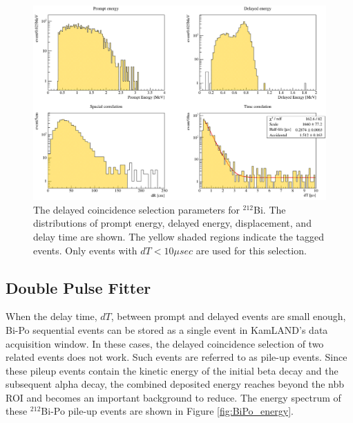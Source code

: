 \begin{figure}[htb]
	\centering
	\includegraphics[scale=0.45]{bi212.png}
	\caption{The delayed coincidence selection parameters for $^{212}$Bi. The distributions of prompt energy, delayed energy, displacement, and delay time are shown. The yellow shaded regions indicate the tagged events. Only events with $dT<10\mu sec$ are used for this selection.}
	\label{fig:BiPo212}
\end{figure}
\subsection*{Double Pulse Fitter}
When the delay time, $dT$, between prompt and delayed events are small enough, Bi-Po sequential events can be stored as a single event in KamLAND's data acquisition window. In these cases, the delayed coincidence selection of two related events does not work. Such events are referred to as pile-up events. Since these pileup events contain the kinetic energy of the initial beta decay and the subsequent alpha decay, the combined deposited energy reaches beyond the \0nbb ROI and becomes an important background to reduce. The energy spectrum of these $^{212}$Bi-Po pile-up events are shown in Figure \ref{fig:BiPo_energy}.

